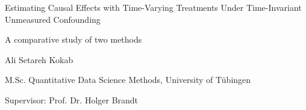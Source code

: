 \documentclass[aspectratio=169,12pt]{beamer}
\newcommand{\muted}[1]{\textcolor{PrimerMuted}{#1}}
\begin{document}
\begin{frame}[plain]
  \vspace*{2.75cm}
  {Estimating Causal Effects with Time-Varying Treatments Under Time-Invariant Unmeasured Confounding\par}
  \vspace{0.28cm}
  {\textcolor{PrimerTeal}{A comparative study of two methods }\par}
  \vspace{0.72cm}
  {Ali Setareh Kokab\par}
  {M.Sc. Quantitative Data Science Methods, University of Tübingen\par}
  \vspace{0.18cm} 
  {\textcolor{black!60}{Supervisor: Prof. Dr. Holger Brandt}\par}
\end{frame}
\end{document}
